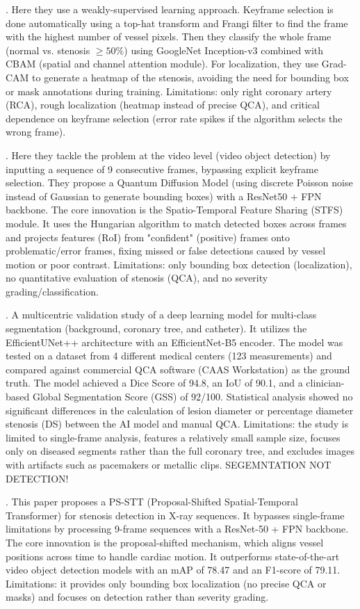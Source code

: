 \documentclass{article}
\begin{document}
\cite{MOON2021105819}. Here they use a weakly-supervised learning approach. Keyframe selection is done automatically using a top-hat transform and Frangi filter to find the frame with the highest number of vessel pixels. Then they classify the whole frame (normal vs. stenosis $\ge50\%$) using GoogleNet Inception-v3 combined with CBAM (spatial and channel attention module). For localization, they use Grad-CAM to generate a heatmap of the stenosis, avoiding the need for bounding box or mask annotations during training. Limitations: only right coronary artery (RCA), rough localization (heatmap instead of precise QCA), and critical dependence on keyframe selection (error rate spikes if the algorithm selects the wrong frame).

\cite{STQD-Det}. Here they tackle the problem at the video level (video object detection) by inputting a sequence of 9 consecutive frames, bypassing explicit keyframe selection. They propose a Quantum Diffusion Model (using discrete Poisson noise instead of Gaussian to generate bounding boxes) with a ResNet50 + FPN backbone. The core innovation is the Spatio-Temporal Feature Sharing (STFS) module. It uses the Hungarian algorithm to match detected boxes across frames and projects features (RoI) from "confident" (positive) frames onto problematic/error frames, fixing missed or false detections caused by vessel motion or poor contrast. Limitations: only bounding box detection (localization), no quantitative evaluation of stenosis (QCA), and no severity grading/classification.

\cite{menezes2023}. A multicentric validation study of a deep learning model for multi-class segmentation (background, coronary tree, and catheter). It utilizes the EfficientUNet++ architecture with an EfficientNet-B5 encoder. The model was tested on a dataset from 4 different medical centers (123 measurements) and compared against commercial QCA software (CAAS Workstation) as the ground truth. The model achieved a Dice Score of 94.8, an IoU of 90.1, and a clinician-based Global Segmentation Score (GSS) of 92/100. Statistical analysis showed no significant differences in the calculation of lesion diameter or percentage diameter stenosis (DS) between the AI model and manual QCA. Limitations: the study is limited to single-frame analysis, features a relatively small sample size, focuses only on diseased segments rather than the full coronary tree, and excludes images with artifacts such as pacemakers or metallic clips. SEGEMNTATION NOT DETECTION!

\cite{HAN2023106546}. This paper proposes a PS-STT (Proposal-Shifted Spatial-Temporal Transformer) for stenosis detection in X-ray sequences. It bypasses single-frame limitations by processing 9-frame sequences with a ResNet-50 + FPN backbone. The core innovation is the proposal-shifted mechanism, which aligns vessel positions across time to handle cardiac motion. It outperforms state-of-the-art video object detection models with an mAP of 78.47 and an F1-score of 79.11. Limitations: it provides only bounding box localization (no precise QCA or masks) and focuses on detection rather than severity grading.
\end{document}

